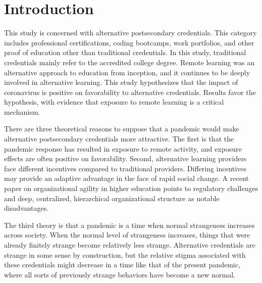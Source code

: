 \documentclass[review]{elsarticle}
\begin{document}
\pagebreak
\linenumbers

\section{Introduction}

This study is concerned with alternative postsecondary credentials.
This category includes professional certifications, coding bootcamps, work portfolios,
and other proof of education other than traditional credentials.
In this study, traditional credentials mainly refer to the accredited college degree.
Remote learning was an alternative approach to education from inception, and it continues to be deeply involved in alternative learning.
This study hypothesizes that the impact of coronavirus is positive on favorability to alternative credentials.
Results favor the hypothesis, with evidence that exposure to remote learning is a critical mechanism.

There are three theoretical reasons to suppose that a pandemic would make alternative postsecondary credentials more attractive.
The first is that the pandemic response has resulted in exposure to remote activity,
and exposure effects are often positive on favorability.
Second, alternative learning providers face different incentives compared to traditional providers.
Differing incentives may provide an adaptive advantage in the face of rapid social change.
A recent paper on organizational agility in higher education points to regulatory challenges
and deep, centralized, hierarchical organizational structure as notable disadvantages\cite{menon2020factors}.

The third theory is that a pandemic is a time when normal strangeness increases across society.
When the normal level of strangeness increases, things that were already finitely strange become relatively less strange.
Alternative credentials are strange in some sense by construction,
but the relative stigma associated with these credentials might decrease in a time like that of the present pandemic,
where all sorts of previously strange behaviors have become a new normal.
\end{document}
